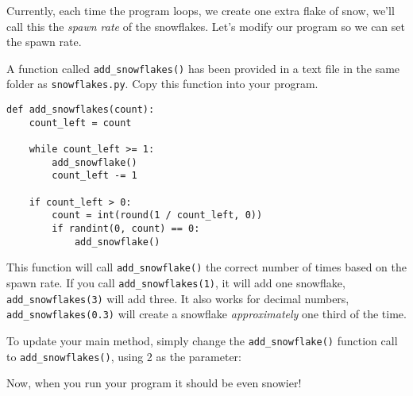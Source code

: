 Currently, each time the program loops, we create one extra flake of snow, we'll call this the \textit{spawn rate} of the snowflakes. Let's modify our program so we can set the spawn rate.

A function called \texttt{add\_snowflakes()} has been provided in a text file in the same folder as \texttt{snowflakes.py}. Copy this function into your program.

\begin{lstlisting}[style=Python, numbers=none]
def add_snowflakes(count):
	count_left = count

	while count_left >= 1:
		add_snowflake()
		count_left -= 1

	if count_left > 0:
		count = int(round(1 / count_left, 0))
		if randint(0, count) == 0:
			add_snowflake()
\end{lstlisting}

This function will call \texttt{add\_snowflake()} the correct number of times based on the spawn rate. If you call \texttt{add\_snowflakes(1)}, it will add one snowflake, \texttt{add\_snowflakes(3)} will add three.
It also works for decimal numbers, \texttt{add\_snowflakes(0.3)} will create a snowflake \textit{approximately} one third of the time.

To update your main method, simply change the \texttt{add\_snowflake()} function call to \texttt{add\_snowflakes()}, using 2 as the parameter:



Now, when you run your program it should be even snowier!
